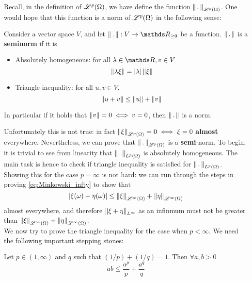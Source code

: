 Recall, in the definition of $\mathcal{L}^p(\Omega)$, we have define the function $\left\| \,.\, \right\|_{\mathcal{L}^p(\Omega)}$. One would hope that this function is a norm of $\mathcal{L}^p(\Omega)$ in the following sense:

\begin{definition} Consider a vector space $V$, and let $\norm{\,.\,}:V \to \R_{\geq 0}$ be a function. $\left\| \,.\, \right\|$ is a \textbf{seminorm} if it is
\begin{itemize}
    \item Absolutely homogeneous: for all $\lambda \in \R, v \in V$
    \begin{equation}
        \left\| \lambda \xi \right\| = |\lambda| \left\| \xi \right\|
    \end{equation}
    \item Triangle inequality: for all $u,v \in V$,
    \begin{equation}
        \left\| u + v \right\| \leq \left\| u \right\| + \left\| v \right\|
    \end{equation}
\end{itemize}
In particular if it holds that $\left\| v \right\| = 0 \iff v = 0$, then $\left\| \,.\, \right\|$ is a norm.
\end{definition}

Unfortunately this is not true: in fact $\left\| \xi \right\|_{\mathcal{L}^p(\Omega)} = 0 \iff \xi = 0$ \textbf{almost} everywhere. Nevertheless, we can prove that $\left\| \,.\, \right\|_{\mathcal{L}^p(\Omega)}$ is a \textbf{semi}-norm. To begin, it is trivial to see from linearity that $\left\| \,.\, \right\|_{L^p(\Omega)}$ is absolutely homogeneous. The main task is hence to check if triangle inequality is satisfied for $\left\| \,.\, \right\|_{L^p(\Omega)}$. Showing this for the case $p = \infty$ is not hard: we can run through the steps in proving \eqref{eq:Minkowski_infty} to show that 
\begin{equation*}
    |\xi(\omega) + \eta(\omega)| \leq \left\| \xi \right\|_{\mathcal{L}^\infty(\Omega)} + \left\| \eta \right\|_{\mathcal{L}^\infty(\Omega)}
\end{equation*}
almost everywhere, and therefore $\left\| \xi + \eta \right\|_{L^\infty}$ as an infinmum must not be greater than $\left\| \xi \right\|_{\mathcal{L}^\infty(\Omega)} + \left\| \eta \right\|_{\mathcal{L}^\infty(\Omega)}$.\\

We now try to prove the triangle inequality for the case when $p<\infty$. We need the following important stepping stones:

\begin{proposition}
Let $p \in (1,\infty)$ and $q$ such that $(1/p) + (1/q) = 1$. Then $\forall a,b > 0$
\begin{equation} \label{eq:Young}
    ab \leq \frac{a^p}{p} + \frac{a^q}{q}
\end{equation}
\end{proposition}

